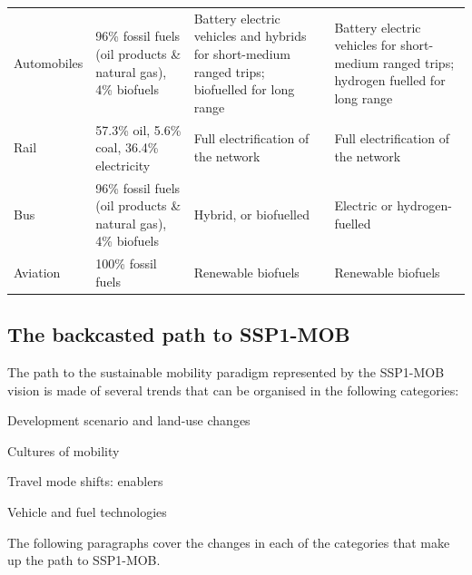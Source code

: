 \begin{landscape}
{\begin{longtable}{p{3cm}p{5cm}p{5cm}p{5cm}}
Automobiles & 96\% fossil fuels (oil products \& natural gas), 4\% biofuels \parencite{iea2017_Statisticswebportal} & Battery electric vehicles and hybrids for short-medium ranged trips; biofuelled for long range & Battery electric vehicles for short-medium ranged trips; hydrogen fuelled for long range \\*
Rail & 57.3\% oil, 5.6\% coal, 36.4\% electricity \parencite{cazzola2016_RailwayHandbook2016} & Full electrification of the network & Full electrification of the network \\*
Bus & 96\% fossil fuels (oil products \& natural gas), 4\% biofuels \parencite{iea2017_Statisticswebportal} & Hybrid, or biofuelled & Electric or hydrogen-fuelled \\*
Aviation & 100\% fossil fuels \parencite{iea2017_Statisticswebportal} & Renewable biofuels & Renewable biofuels
\end{longtable}
}
\end{landscape}

\subsection{The backcasted path to SSP1-MOB}
\label{ss:results:backcasting-the-path}
The path to the sustainable mobility paradigm represented by the SSP1-MOB vision is made of several trends that can be organised in the following categories:
%
\begin{enumeratealpha}
\item Development scenario and land-use changes
\item Cultures of mobility
\item Travel mode shifts: enablers
\item Vehicle and fuel technologies
\end{enumeratealpha}
%
The following paragraphs cover the changes in each of the categories that make up the path to SSP1-MOB.

